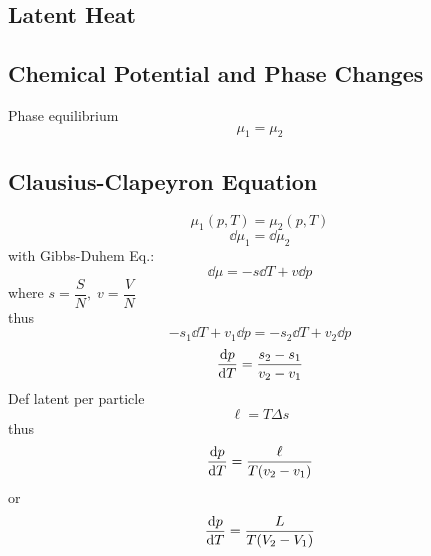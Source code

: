 \documentclass[UTF8]{ctexart} %
\numberwithin{equation}{subsection}
\begin{document}
\subsection{Latent Heat}

\subsection{Chemical Potential and Phase Changes}
Phase equilibrium
\begin{equation}\label{key}
\mu_1 = \mu_2
\end{equation}

\subsection{Clausius-Clapeyron Equation}
\begin{equation}\label{key}
\mu_1(p,T) = \mu_2(p,T)
\end{equation}
\begin{equation}\label{key}
\dd\mu_1 = \dd\mu_2
\end{equation}
with Gibbs-Duhem Eq.:
\begin{equation}\label{key}
\dd\mu = - s\dd T + v\dd p
\end{equation}
where $s = \dfrac{S}{N},\; v = \dfrac{V}{N}$\\
thus
\begin{equation}\label{key}
-s_1\dd T + v_1\dd p = -s_2\dd T + v_2\dd p
\end{equation}
\begin{equation}\label{key}
\dv{p}{T} = \dfrac{s_2 - s_1}{v_2 - v_1}
\end{equation}
Def latent per particle
\begin{equation}\label{key}
\ell = T\Delta s
\end{equation}
thus
\begin{equation}\label{key}
\dv{p}{T} = \dfrac{\ell}{T(v_2 - v_1)}
\end{equation}
or
\begin{equation}\label{key}
\dv{p}{T} = \dfrac{L}{T(V_2 - V_1)}
\end{equation}
\end{document}
